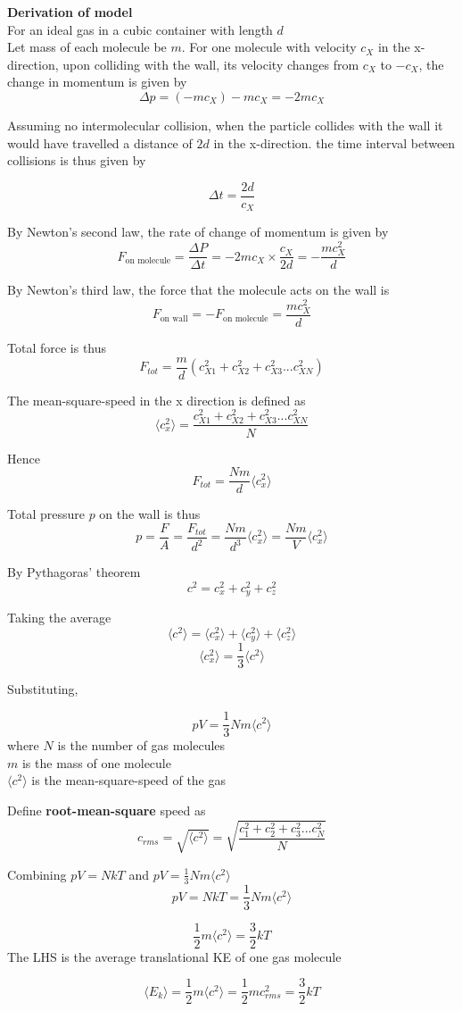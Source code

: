 \documentclass[a4paper, 10pt]{article}
\begin{document}
\textbf{Derivation of model} \\

For an ideal gas in a cubic container with length $d$  \\
Let mass of each molecule be $m$. For one molecule with velocity $c_X$ in the x-direction, upon colliding with the wall, its velocity changes from $c_X$ to $-c_X$, the change in momentum is given by
\[
   \Delta p = (-mc_X) - mc_X = -2 mc_X
\]

Assuming no intermolecular collision, when the particle collides with the wall it would have travelled a distance of $2d$ in the x-direction. the time interval between collisions is thus given by

\[
\Delta t = \frac{2d}{c_X}
\]

By Newton's second law, the rate of change of momentum is given by
\[
   F_{\text{on molecule}} = \frac{\Delta P}{\Delta t} = -2mc_X \times \frac{c_X}{2d} = -\frac{mc_X^2}{d}
\]

By Newton's third law, the force that the molecule acts on the wall is 
\[
   F_{\text{on wall}} = - F_{\text{on molecule}} = \frac{mc_X^2}{d}
\]

Total force is thus
\[
   F_{tot} = \frac{m}{d}(c_{X1}^2 + c_{X2}^2 + c_{X3}^2 ... c_{XN}^2)
\]

The mean-square-speed in the x direction is defined as 
\[
\langle c_x^2 \rangle = \frac{c_{X1}^2 + c_{X2}^2 + c_{X3}^2 ... c_{XN}^2}{N}
\]

Hence 
\[
   F_{tot} = \frac{Nm}{d} \langle c_x^2 \rangle
\]

Total pressure $p$ on the wall is thus
\[
   p = \frac{F}{A} = \frac{F_{tot}}{d^2} = \frac{Nm}{d^3} \langle c_x^2 \rangle = \frac{Nm}{V}\langle c_x^2 \rangle 
\]

By Pythagoras' theorem
\[
c^2 = c_x^2 + c_y^2 + c_z^2
\]

Taking the average
\[
\langle c^2 \rangle = \langle c_x^2 \rangle + \langle c_y^2 \rangle + \langle c_z^2 \rangle
\]
\[
\langle c_x^2 \rangle = \frac{1}{3} \langle c^2 \rangle
\]

Substituting, 
\begin{framed}
\[
pV = \frac{1}{3} Nm \langle c^2 \rangle
\]
where $N$ is the number of gas molecules \\
$m$ is the mass of one molecule \\
$\langle c^2 \rangle$ is the mean-square-speed of the gas
\end{framed}	

Define \textbf{root-mean-square} speed as 
\[
   c_{rms} = \sqrt{\langle c^2 \rangle} = \sqrt{\frac{c_1^2 + c_2^2 + c_3^2 ... c_N^2}{N}}
\]


Combining $pV = NkT$  and $pV = \frac{1}{3}Nm\langle c^2 \rangle$ 
\[
pV = NkT = \frac{1}{3}Nm \langle c^2 \rangle
\]

\[
\frac{1}{2}m \langle c^2 \rangle = \frac{3}{2} kT
\]
The LHS is the average translational KE of one gas molecule 
\begin{framed}
   \[
      \langle E_k \rangle = \frac{1}{2}m \langle c^2 \rangle = \frac{1}{2}mc_{rms}^2 = \frac{3}{2}kT
   \]
   
\end{framed}	
\end{document}
